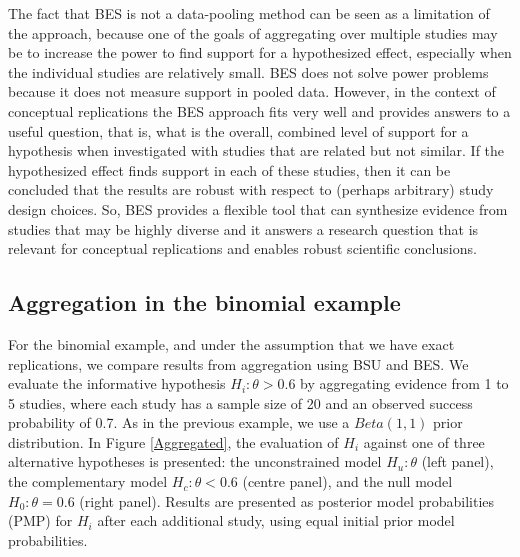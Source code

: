 \documentclass[11pt,reqno]{article}
\begin{document}
The fact that BES is not a data-pooling method can be seen as a limitation of the approach, because one of the goals of aggregating over multiple studies may be to increase the power to find support for a hypothesized effect, especially when the individual studies are relatively small. BES does not solve power problems because it does not measure support in pooled data. However, in the context of conceptual replications the BES approach fits very well and provides answers to a useful question, that is, what is the overall, combined level of support for a hypothesis when investigated with studies that are related but not similar.
If the hypothesized effect finds support in each of these studies, then it can be concluded that the results are robust with respect to (perhaps arbitrary) study design choices. So, BES provides a flexible tool that can synthesize evidence from studies that may be highly diverse and it answers a research question that is relevant for conceptual replications and enables robust scientific conclusions.



\subsection{Aggregation in the binomial example}\label{Binmultiple}

For the binomial example, and under the assumption that we have exact replications, we compare results from aggregation using BSU and BES. We evaluate the informative hypothesis $H_i: \theta>0.6$ by aggregating evidence from 1 to 5 studies, where each study has a sample size of 20 and an observed success probability of 0.7. As in the previous example, we use a $Beta(1,1)$ prior distribution. In Figure \ref{Aggregated}, the evaluation of $H_i$ against one of three alternative hypotheses is presented: the unconstrained model $H_u: \theta$ (left panel), the complementary model $H_c: \theta<0.6$ (centre panel), and the null model $H_0: \theta=0.6$ (right panel). Results are presented as posterior model probabilities (PMP) for $H_i$ after each additional study, using equal initial prior model probabilities.
\end{document}
